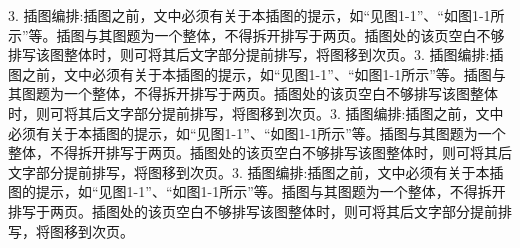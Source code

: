 3. 插图编排:插图之前，文中必须有关于本插图的提示，如“见图1-1”、“如图1-1所示”等。插图与其图题为一个整体，不得拆开排写于两页。插图处的该页空白不够排写该图整体时，则可将其后文字部分提前排写，将图移到次页。3. 插图编排:插图之前，文中必须有关于本插图的提示，如“见图1-1”、“如图1-1所示”等。插图与其图题为一个整体，不得拆开排写于两页。插图处的该页空白不够排写该图整体时，则可将其后文字部分提前排写，将图移到次页。3. 插图编排:插图之前，文中必须有关于本插图的提示，如“见图1-1”、“如图1-1所示”等。插图与其图题为一个整体，不得拆开排写于两页。插图处的该页空白不够排写该图整体时，则可将其后文字部分提前排写，将图移到次页。3. 插图编排:插图之前，文中必须有关于本插图的提示，如“见图1-1”、“如图1-1所示”等。插图与其图题为一个整体，不得拆开排写于两页。插图处的该页空白不够排写该图整体时，则可将其后文字部分提前排写，将图移到次页。